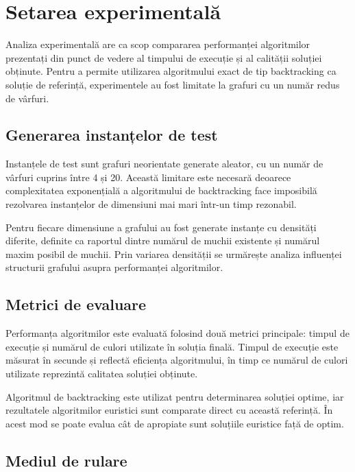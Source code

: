 \documentclass[runningheads]{llncs}
\begin{document}
\section{Setarea experimentală}

Analiza experimentală are ca scop compararea performanței algoritmilor
prezentați din punct de vedere al timpului de execuție și al calității
soluției obținute. Pentru a permite utilizarea algoritmului exact de tip
backtracking ca soluție de referință, experimentele au fost limitate la
grafuri cu un număr redus de vârfuri.

\subsection{Generarea instanțelor de test}

Instanțele de test sunt grafuri neorientate generate aleator, cu un număr de
vârfuri cuprins între 4 și 20. Această limitare este necesară deoarece
complexitatea exponențială a algoritmului de backtracking face imposibilă
rezolvarea instanțelor de dimensiuni mai mari într-un timp rezonabil.

Pentru fiecare dimensiune a grafului au fost generate instanțe cu densități
diferite, definite ca raportul dintre numărul de muchii existente și numărul
maxim posibil de muchii. Prin variarea densității se urmărește analiza
influenței structurii grafului asupra performanței algoritmilor.

\subsection{Metrici de evaluare}

Performanța algoritmilor este evaluată folosind două metrici principale:
timpul de execuție și numărul de culori utilizate în soluția finală. Timpul
de execuție este măsurat în secunde și reflectă eficiența algoritmului, în
timp ce numărul de culori utilizate reprezintă calitatea soluției obținute.

Algoritmul de backtracking este utilizat pentru determinarea soluției optime,
iar rezultatele algoritmilor euristici sunt comparate direct cu această
referință. În acest mod se poate evalua cât de apropiate sunt soluțiile
euristice față de optim.

\subsection{Mediul de rulare}
\end{document}
